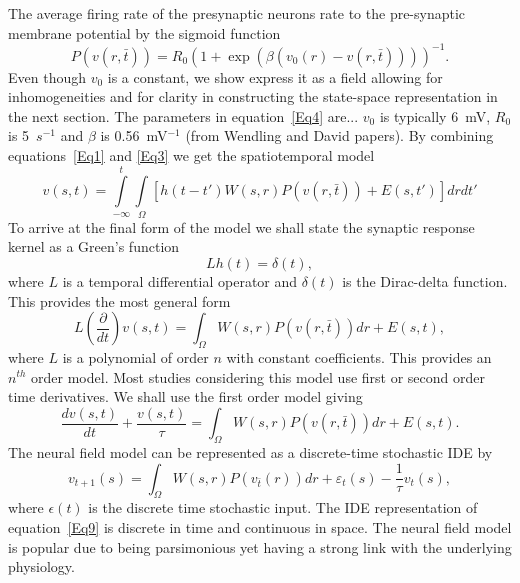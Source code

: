 \documentclass[onecolumn,draftcls]{IEEEtran}
\begin{document}
The average firing rate of the presynaptic neurons rate to the pre-synaptic membrane potential by the sigmoid function
\begin{equation}\label{Eq4}
P\left( {v\left( {r,\bar t} \right)} \right) = {R_0}{\left( {1 + \exp \left( {\beta \left( {{v_0}\left( r \right) - v\left( {r,\bar t} \right)} \right)} \right)} \right)^{ - 1}}.
\end{equation}
Even though $v_0$ is a constant, we show express it as a field allowing for inhomogeneities and for clarity in constructing the state-space representation in the next section. The parameters in equation~\ref{Eq4} are... $v_0$ is typically 6~mV, $R_0$ is 5~$s^{-1}$ and $\beta$ is 0.56~mV$^{-1}$ (from Wendling and David papers). By combining equations~\ref{Eq1} and \ref{Eq3} we get the spatiotemporal model
\begin{equation}\label{Eq5}
v\left(s,t\right) = \int\limits_{-\infty}^t\int\limits_\Omega \left[ h\left(t - t'\right)W\left(s,r\right)P\left( v\left( r,\bar t \right)\right)+E\left(s,t'\right)\right] dr dt'
\end{equation}
To arrive at the final form of the model we shall state the synaptic response kernel as a Green's function
\begin{equation}\label{Eq6}
Lh\left( t \right) = \delta \left( t \right),
\end{equation}
where $L$ is a temporal differential operator and $\delta(t)$ is the Dirac-delta function. This provides the most general form
\begin{equation}\label{Eq7}
L\left( {\frac{\partial }{{dt}}} \right)v\left( {s,t} \right) = \int_\Omega  {W\left( {s,r} \right)P\left( {v\left( {r,\bar t} \right)} \right)dr}  + E\left( {s,t} \right),
\end{equation}
where $L$ is a polynomial of order $n$ with constant coefficients. This provides an $n^{th}$ order model. Most studies considering this model use first or second order time derivatives. We shall use the first order model giving
\begin{equation}\label{Eq8}
\frac{{dv\left( {s,t} \right)}}{{dt}} + \frac{{v\left( {s,t} \right)}}{\tau } = \int_\Omega  {W\left( {s,r} \right)P\left( {v\left( {r,\bar t} \right)} \right)dr}  + E\left( {s,t} \right).
\end{equation}
The neural field model can be represented as a discrete-time stochastic IDE by
\begin{equation}\label{Eq9}
{v_{t + 1}}\left( s \right) = \int_\Omega  {W\left( {s,r} \right)P\left( {{v_{\bar t}}\left( r \right)} \right)dr}  + {\varepsilon _t}\left( s \right) - \frac{1}{\tau }{v_t}\left( s \right),
\end{equation}
where $\epsilon(t)$ is the discrete time stochastic input. The IDE representation of equation~\ref{Eq9} is discrete in time and continuous in space. The neural field model is popular due to being parsimonious yet having a strong link with the underlying physiology.
\end{document}
